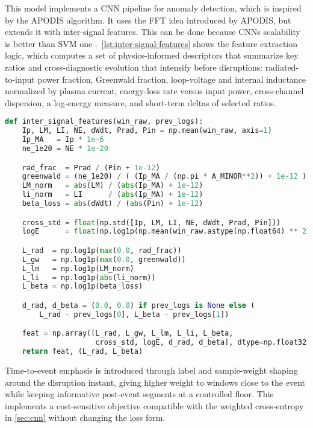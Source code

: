 This model implements a \ac{CNN} pipeline for anomaly detection, which is inspired by the \ac{APODIS} algorithm. It uses the \ac{FFT} idea introduced by \ac{APODIS}, but extends it with inter-signal features. This can be done because \ac{CNN}s scalability is better than SVM one .\ \autoref{lst:inter-signal-features} shows the feature extraction logic, which computes a set of physics-informed descriptors that summarize key ratios and cross-diagnostic evolution that intensify before disruptions: radiated-to-input power fraction, Greenwald fraction, loop-voltage and internal inductance normalized by plasma current, energy-loss rate versus input power, cross-channel dispersion, a log-energy measure, and short-term deltas of selected ratios.

\begin{lstlisting}[language=Python, caption={Inter-signal feature vector used for early coupling and trend capture.}, label={lst:inter-signal-features}]
def inter_signal_features(win_raw, prev_logs):
    Ip, LM, LI, NE, dWdt, Prad, Pin = np.mean(win_raw, axis=1)
    Ip_MA   = Ip * 1e-6
    ne_1e20 = NE * 1e-20

    rad_frac  = Prad / (Pin + 1e-12)
    greenwald = (ne_1e20) / ( (Ip_MA / (np.pi * A_MINOR**2)) + 1e-12 )
    LM_norm   = abs(LM) / (abs(Ip_MA) + 1e-12)
    li_norm   = LI      / (abs(Ip_MA) + 1e-12)
    beta_loss = abs(dWdt) / (abs(Pin) + 1e-12)

    cross_std = float(np.std([Ip, LM, LI, NE, dWdt, Prad, Pin]))
    logE      = float(np.log1p(np.mean(win_raw.astype(np.float64) ** 2)))

    L_rad  = np.log1p(max(0.0, rad_frac))
    L_gw   = np.log1p(max(0.0, greenwald))
    L_lm   = np.log1p(LM_norm)
    L_li   = np.log1p(abs(li_norm))
    L_beta = np.log1p(beta_loss)

    d_rad, d_beta = (0.0, 0.0) if prev_logs is None else (
        L_rad - prev_logs[0], L_beta - prev_logs[1])

    feat = np.array([L_rad, L_gw, L_lm, L_li, L_beta,
                     cross_std, logE, d_rad, d_beta], dtype=np.float32)
    return feat, (L_rad, L_beta)
\end{lstlisting}

Time-to-event emphasis is introduced through label and sample-weight shaping around the disruption instant, giving higher weight to windows close to the event while keeping informative post-event segments at a controlled floor. This implements a cost-sensitive objective compatible with the weighted cross-entropy in \autoref{sec:cnn} without changing the loss form.

